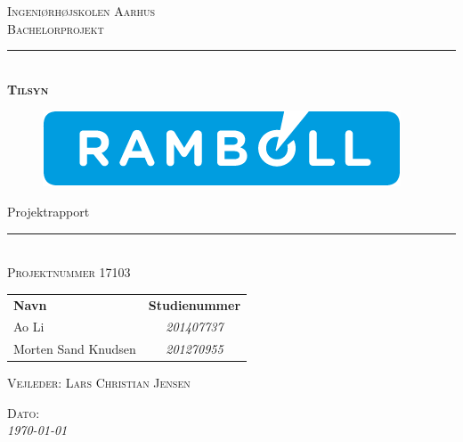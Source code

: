 \thispagestyle{empty}
\newcommand{\HRule}{\rule{\linewidth}{0.1mm}} %

\begin{center}
	\vspace{3cm}
	\textsc{\LARGE Ingeniørhøjskolen Aarhus}\\[1.5cm] %
	
	\textsc{\large Bachelorprojekt}\\[2.5cm] 
	
	\HRule \\[0.8cm]
	{\huge \bfseries \textsc{Tilsyn}} 
	\begin{figure}[h!]
		\centering
		\includegraphics[width=0.7\linewidth]{Forside/Logo}
	\end{figure}

	{\LARGE Projektrapport} \\[0.4cm]
	\HRule \\[1.5cm]
	

	
	\textsc{\large Projektnummer 17103}\\
	\vspace{0.5 in}
	\begin{center}
		\begin{tabular}{l c}
			\textbf{Navn} & \textbf{Studienummer} \\
			Ao Li & \textsl{201407737}    \\
			Morten Sand Knudsen & \textsl{201270955}  \\
			
			
		\end{tabular}
	\end{center}
	\vspace{0.5 in}
	
	\textsc{\large Vejleder: Lars Christian Jensen}
	\vspace{0.5 in}
	
	\textsc{\large Dato: }\\
	{\large\textit{\today}} \\[3cm]
	\vfill %
	
\end{center} %

\clearpage

\newpage